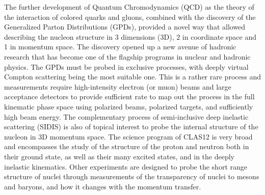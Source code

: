 \documentclass[final,3p,twocolumn]{elsarticle}
\begin{document}
The further development of Quantum Chromodynamics (QCD) as the theory of the interaction of colored quarks and
gluons, combined with the discovery of the Generalized Parton Distributions (GPDs), provided a novel way that allowed
describing the nucleon structure in 3 dimensions (3D), 2 in coordinate space and 1 in momentum space. The discovery
opened up a new avenue of hadronic research that has become one of the flagship programs in nuclear and hadronic
physics. The GPDs must be probed in exclusive processes, with deeply virtual Compton scattering being the most
suitable one. This is a rather rare process and measurements require high-intensity electron (or muon) beams and
large acceptance detectors to provide sufficient rate to map out the process in the full kinematic phase space using
polarized beams, polarized targets, and sufficiently high beam energy. The complementary process of semi-inclusive
deep inelastic scattering (SIDIS) is also of topical interest to probe the internal structure of the nucleon in 3D
momentum space. The science program of CLAS12 is very broad~\cite{Burkert:2018nvj} and encompasses the study
of the structure of the proton and neutron both in their ground state, as well as their many excited states, and in the
deeply inelastic kinematics. Other experiments are designed to probe the short range structure of nuclei through
measurements of the transparency of nuclei to mesons and baryons, and how it changes with the momentum transfer.   
\end{document}

